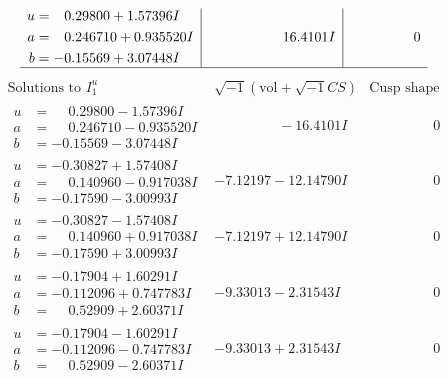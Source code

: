 \documentclass[1p]{elsarticle_modified}
\theoremstyle{definition}
\newcommand{\I}{\sqrt{-1}}
\begin{document}
$$\begin{array}{c|c|c}
\begin{aligned}
u &= \phantom{-}0.29800 + 1.57396 I \\
a &= \phantom{-}0.246710 + 0.935520 I \\
b &= -0.15569 + 3.07448 I\end{aligned}
 & \phantom{-0.000000 -}16.4101 I & \phantom{-0.000000 } 0\\
 \hline 
 \end{array}$$\newpage$$\begin{array}{c|c|c}  
\text{Solutions to }I^u_{1}& \I (\text{vol} + \sqrt{-1}CS) & \text{Cusp shape}\\
 \hline 
\begin{aligned}
u &= \phantom{-}0.29800 - 1.57396 I \\
a &= \phantom{-}0.246710 - 0.935520 I \\
b &= -0.15569 - 3.07448 I\end{aligned}
 & \phantom{-0.000000 } -16.4101 I & \phantom{-0.000000 } 0 \\ \hline\begin{aligned}
u &= -0.30827 + 1.57408 I \\
a &= \phantom{-}0.140960 - 0.917038 I \\
b &= -0.17590 - 3.00993 I\end{aligned}
 & -7.12197 - 12.14790 I & \phantom{-0.000000 } 0 \\ \hline\begin{aligned}
u &= -0.30827 - 1.57408 I \\
a &= \phantom{-}0.140960 + 0.917038 I \\
b &= -0.17590 + 3.00993 I\end{aligned}
 & -7.12197 + 12.14790 I & \phantom{-0.000000 } 0 \\ \hline\begin{aligned}
u &= -0.17904 + 1.60291 I \\
a &= -0.112096 + 0.747783 I \\
b &= \phantom{-}0.52909 + 2.60371 I\end{aligned}
 & -9.33013 - 2.31543 I & \phantom{-0.000000 } 0 \\ \hline\begin{aligned}
u &= -0.17904 - 1.60291 I \\
a &= -0.112096 - 0.747783 I \\
b &= \phantom{-}0.52909 - 2.60371 I\end{aligned}
 & -9.33013 + 2.31543 I & \phantom{-0.000000 } 0 \\ \hline\begin{aligned}

\end{aligned}
\end{array}$$
\end{document}
